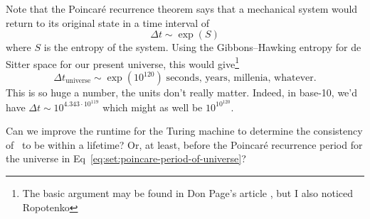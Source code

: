 \begin{node}
\begin{node}
\begin{node}
Note that the Poincar\'e recurrence theorem says that a mechanical
system would return to its original state in a time interval of
\begin{equation}
\Delta t\sim\exp(S)
\end{equation}
where $S$ is the entropy of the system. Using the Gibbons--Hawking
entropy for de Sitter space for our present universe, this would
give\footnote{The basic argument may be found in Don Page's article
, but I also noticed Ropotenko }
\begin{equation}\label{eq:set:poincare-period-of-universe}
\Delta t_{\text{universe}}\sim\exp(10^{120})\;\mbox{seconds, years,
  millenia, whatever}.
\end{equation}
This is so huge a number, the units don't really matter. Indeed, in
base-10, we'd have $\Delta t\sim 10^{4.343\cdot 10^{119}}$ which might
as well be $10^{10^{120}}$.
\end{node}
\end{node}

\begin{puzzle}
Can we improve the runtime for the Turing machine to determine the
consistency of \ZFC\ to be within a lifetime? Or, at least, before the
Poincar\'e recurrence period for the universe in Eq~\eqref{eq:set:poincare-period-of-universe}?
\end{puzzle}
\end{node} %
